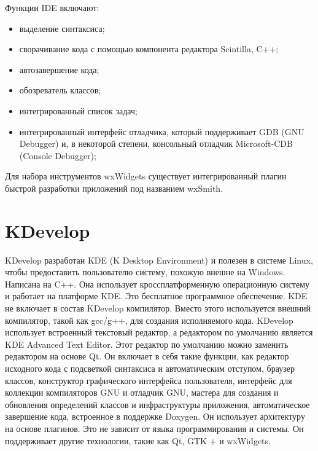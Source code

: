 Функции IDE включают:\\ 
\begin{itemize}
    \item выделение синтаксиса;\\
    \item сворачивание кода с помощью компонента редактора Scintilla, C++;\\ 
    \item автозавершение кода; \\
    \item обозреватель классов;\\ 
    \item интегрированный список задач;\\ 
    \item интегрированный интерфейс отладчика, который поддерживает GDB (GNU Debugger) и, в 
        некоторой степени, консольный отладчик Microsoft-CDB (Console Debugger);\\ 
\end{itemize}
Для набора инструментов wxWidgets существует интегрированный плагин быстрой разработки приложений 
под названием wxSmith.\\

\section{KDevelop}
KDevelop разработан KDE (K Desktop Environment) и полезен в системе Linux, чтобы предоставить 
пользователю систему, похожую внешне на Windows. Написана на C++. Она использует кроссплатформенную
операционную систему и работает на платформе KDE. Это бесплатное программное обеспечение. KDE не 
включает в состав KDevelop компилятор. Вместо этого используется внешний компилятор, такой как 
gcc/g++, для создания исполняемого кода. KDevelop использует встроенный текстовый редактор, а 
редактором по умолчанию является KDE Advanced Text Editor. Этот редактор по умолчанию можно 
заменить редактором на основе Qt. Он включает в себя такие функции, как редактор исходного кода с
подсветкой синтаксиса и автоматическим отступом, браузер классов, конструктор графического 
интерфейса пользователя, интерфейс для коллекции компиляторов GNU и отладчик GNU, мастера для 
создания и обновления определений классов и инфраструктуры приложения, автоматическое завершение 
кода, встроенное в поддержке Doxygen. Он использует архитектуру на основе плагинов. Это не зависит 
от языка программирования и системы. Он поддерживает другие технологии, такие как Qt, GTK + и 
wxWidgets.\\

